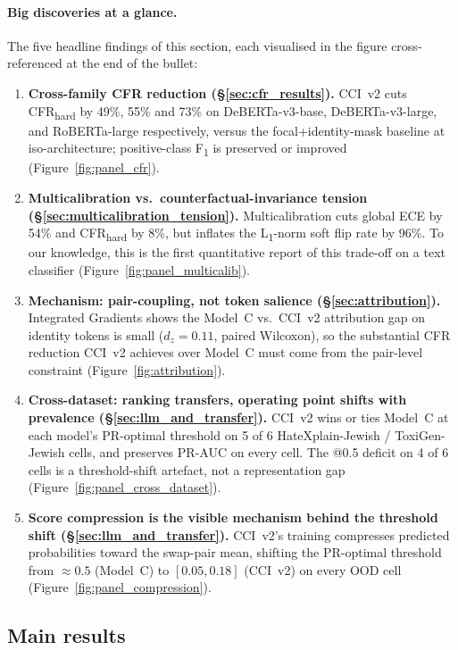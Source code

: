 \documentclass[10pt,a4paper]{article}
\begin{document}
\paragraph{Big discoveries at a glance.}
The five headline findings of this section, each visualised in the figure cross-referenced at the end of the bullet:
\begin{enumerate}[leftmargin=*,itemsep=2pt]
    \item \textbf{Cross-family CFR reduction (\S\ref{sec:cfr_results}).} CCI~v2 cuts CFR\textsubscript{hard} by 49\%, 55\% and 73\% on DeBERTa-v3-base, DeBERTa-v3-large, and RoBERTa-large respectively, versus the focal+identity-mask baseline at iso-architecture; positive-class F\textsubscript{1} is preserved or improved (Figure~\ref{fig:panel_cfr}).
    \item \textbf{Multicalibration vs.\ counterfactual-invariance tension (\S\ref{sec:multicalibration_tension}).} Multicalibration cuts global ECE by 54\% and CFR\textsubscript{hard} by 8\%, but inflates the L\textsubscript{1}-norm soft flip rate by 96\%. To our knowledge, this is the first quantitative report of this trade-off on a text classifier (Figure~\ref{fig:panel_multicalib}).
    \item \textbf{Mechanism: pair-coupling, not token salience (\S\ref{sec:attribution}).} Integrated Gradients shows the Model~C vs.\ CCI~v2 attribution gap on identity tokens is small ($d_z = 0.11$, paired Wilcoxon), so the substantial CFR reduction CCI~v2 achieves over Model~C must come from the pair-level constraint (Figure~\ref{fig:attribution}).
    \item \textbf{Cross-dataset: ranking transfers, operating point shifts with prevalence (\S\ref{sec:llm_and_transfer}).} CCI~v2 wins or ties Model~C at each model's PR-optimal threshold on 5 of 6 HateXplain-Jewish / ToxiGen-Jewish cells, and preserves PR-AUC on every cell. The @0.5 deficit on 4 of 6 cells is a threshold-shift artefact, not a representation gap (Figure~\ref{fig:panel_cross_dataset}).
    \item \textbf{Score compression is the visible mechanism behind the threshold shift (\S\ref{sec:llm_and_transfer}).} CCI~v2's training compresses predicted probabilities toward the swap-pair mean, shifting the PR-optimal threshold from $\approx 0.5$ (Model~C) to $[0.05, 0.18]$ (CCI~v2) on every OOD cell (Figure~\ref{fig:panel_compression}).
\end{enumerate}

\subsection{Main results}
\label{sec:main_results}
\end{document}
